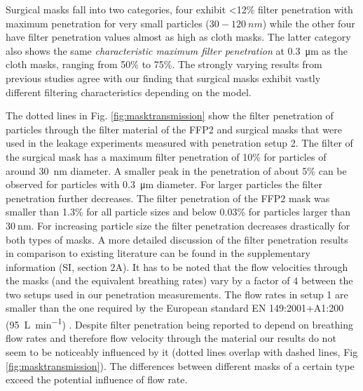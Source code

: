 \documentclass[preprint]{elsarticle}
\begin{document}
Surgical masks fall into two categories, four exhibit \textless 12\% filter penetration with maximum penetration for very small particles ($30-\SI{120}{nm}$) while the other four have filter penetration values almost as high as cloth masks. The latter category also shows the same \emph{characteristic maximum filter penetration} at \SI{0.3}{\micro\meter} as the cloth masks, ranging from 50\% to 75\%. The strongly varying results from previous studies \cite{zangmeister2020filtration, balazy2006n95, grinshpun2009performance, oberg2008surgical} agree with our finding that surgical masks exhibit vastly different filtering characteristics depending on the model.  

The dotted lines in Fig. \ref{fig:masktransmission} show the filter penetration of particles through the filter material of the FFP2 and surgical masks that were used in the leakage experiments measured with penetration setup 2.%
The filter of the surgical mask has a maximum filter penetration of 10\% for particles of around \SI{30}{\nano \meter} diameter. A smaller peak in the penetration of about 5\% can be observed for particles with \SI{0.3}{\micro \meter} diameter. For larger particles the filter penetration further decreases.
The filter penetration of the FFP2 mask was smaller than 1.3\% for all particle sizes and below 0.03\% for particles larger than $\SI{30}{\nano \meter}$. For increasing particle size the filter penetration decreases drastically for both types of masks.
A more detailed discussion of the filter penetration results in comparison to existing literature can be found in the supplementary information (SI, section 2A).
It has to be noted that the flow velocities through the masks (and the equivalent breathing rates) vary by a factor of 4 between the two setups used in our penetration measurements. The flow rates in setup 1 are smaller than the one required by the European standard EN 149:2001+A1:200 (\SI{95}{\liter \per \minute}) \cite{DinNorm}. Despite filter penetration being reported to depend on breathing flow rates and therefore flow velocity through the material \cite[e.g.][]{he2013effect, he2014does, balazy2006n95, balazy2006manikin} our results do not seem to be noticeably influenced by it (dotted lines overlap with dashed lines, Fig \ref{fig:masktransmission}). The differences between different masks of a certain type exceed the potential influence of flow rate.
\end{document}

